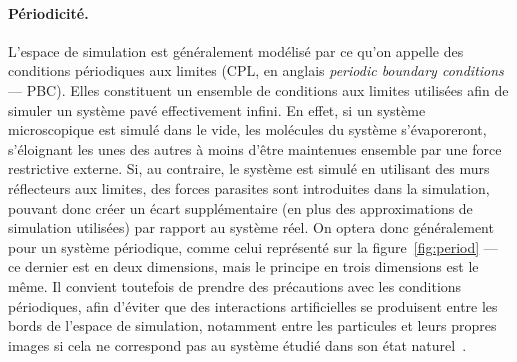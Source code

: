 	\paragraph{Périodicité.}
	L'espace de simulation est généralement modélisé par ce qu'on appelle des conditions périodiques aux limites (CPL, en anglais \emph{periodic boundary conditions} --- PBC). Elles constituent un ensemble de conditions aux limites utilisées afin de simuler un système pavé effectivement infini. En effet, si un système microscopique est simulé dans le vide, les molécules du système s'évaporeront, s'éloignant les unes des autres à moins d'être maintenues ensemble par une force restrictive externe. Si, au contraire, le système est simulé en utilisant des murs réflecteurs aux limites, des forces parasites sont introduites dans la simulation, pouvant donc créer un écart supplémentaire (en plus des approximations de simulation utilisées) par rapport au système réel. On optera donc généralement pour un système périodique, comme celui représenté sur la figure~\ref{fig:period} --- ce dernier est en deux dimensions, mais le principe en trois dimensions est le même. Il convient toutefois de prendre des précautions avec les conditions périodiques, afin d'éviter que des interactions \og artificielles \fg{} se produisent entre les \og bords \fg{} de l'espace de simulation, notamment entre les particules et leurs propres images si cela ne correspond pas au système étudié dans son état naturel~\cite{cheatham1995molecular, de1997effect}.
	
